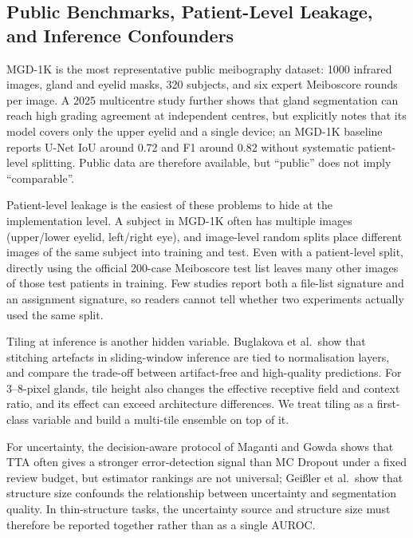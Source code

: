 \subsection{Public Benchmarks, Patient-Level Leakage, and Inference Confounders}

MGD-1K is the most representative public meibography dataset: 1000 infrared images, gland and eyelid masks, 320 subjects, and six expert Meiboscore rounds per image\cite{saha2022automated}. A 2025 multicentre study further shows that gland segmentation can reach high grading agreement at independent centres, but explicitly notes that its model covers only the upper eyelid and a single device\cite{li2025multicenter}; an MGD-1K baseline reports U-Net IoU around 0.72 and F1 around 0.82 without systematic patient-level splitting\cite{yu2025quantitative}. Public data are therefore available, but ``public'' does not imply ``comparable''.

Patient-level leakage is the easiest of these problems to hide at the implementation level. A subject in MGD-1K often has multiple images (upper/lower eyelid, left/right eye), and image-level random splits place different images of the same subject into training and test. Even with a patient-level split, directly using the official 200-case Meiboscore test list leaves many other images of those test patients in training. Few studies report both a file-list signature and an assignment signature, so readers cannot tell whether two experiments actually used the same split.

Tiling at inference is another hidden variable. Buglakova et al.\ show that stitching artefacts in sliding-window inference are tied to normalisation layers, and compare the trade-off between artifact-free and high-quality predictions\cite{buglakova2025tiling}. For 3--8-pixel glands, tile height also changes the effective receptive field and context ratio, and its effect can exceed architecture differences. We treat tiling as a first-class variable and build a multi-tile ensemble on top of it.

For uncertainty, the decision-aware protocol of Maganti and Gowda shows that TTA often gives a stronger error-detection signal than MC Dropout under a fixed review budget, but estimator rankings are not universal\cite{maganti2026uncertainty}; Geißler et al.\ show that structure size confounds the relationship between uncertainty and segmentation quality\cite{geissler2024structure}. In thin-structure tasks, the uncertainty source and structure size must therefore be reported together rather than as a single AUROC.

